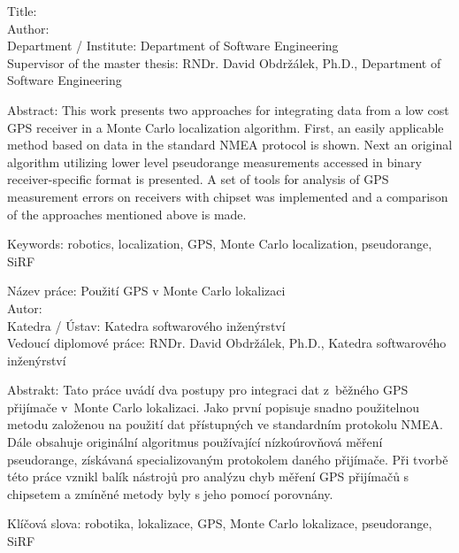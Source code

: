 \noindent
Title: \thetitle\\
Author: \theauthor\\
Department / Institute: Department of Software Engineering\\
Supervisor of the master thesis: RNDr. David Obdržálek, Ph.D., Department of Software Engineering

\vspace{5mm}

\noindent
Abstract: This work presents two approaches for integrating data from a low
cost GPS receiver in a Monte Carlo localization algorithm.
First, an easily applicable method based on data in the standard NMEA protocol is shown.
Next an original algorithm utilizing lower level pseudorange measurements accessed in
binary receiver-specific format is presented.
A set of tools for analysis of GPS measurement errors on receivers
with \sirf chipset was implemented and a comparison of the approaches mentioned above is made.

\vspace{5mm}

\noindent
Keywords: robotics, localization, GPS, Monte Carlo localization, pseudorange, SiRF

\vspace{25mm}

\noindent
Název práce: Použití GPS v Monte Carlo lokalizaci\\
Autor: \theauthor\\
Katedra / Ústav: Katedra softwarového inženýrství\\
Vedoucí diplomové práce: RNDr. David Obdržálek, Ph.D., Katedra softwarového inženýrství

\vspace{5mm}

\noindent
Abstrakt: Tato práce uvádí dva postupy pro integraci dat z~běžného GPS přijímače
v~Monte Carlo lokalizaci.
Jako první popisuje snadno použitelnou metodu založenou na použití dat přístupných ve standardním
protokolu NMEA.
Dále obsahuje originální algoritmus používající nízkoúrovňová měření pseudorange,
získávaná specializovaným protokolem daného přijímače.
Při tvorbě této práce vznikl balík nástrojů pro analýzu chyb měření GPS přijímačů
s chipsetem \sirf a zmíněné metody byly s jeho pomocí porovnány.

\vspace{5mm}

\noindent
Klíčová slova: robotika, lokalizace, GPS, Monte Carlo lokalizace, pseudorange, SiRF

\cleartorecto

